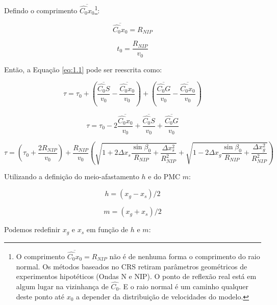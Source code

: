 \documentclass[a4paper, 12pt]{article}
\begin{document}
Defindo o comprimento $\overline{\hat{C_0}x_0}$\footnote{O comprimento
$\overline{\hat{C_0}x_0} = R_{NIP}$ não é de nenhuma forma o comprimento do raio normal.
Os métodos baseados no CRS
retiram parâmetros geométricos de experimentos hipotéticos (Ondas N e NIP).
O ponto de reflexão real está em algum lugar na vizinhança de $\hat{C_0}$.
E o raio normal é um caminho qualquer deste ponto até $x_0$ a depender da distribuição de velocidades
do modelo.}:

\begin{equation}
 \label{eq:1.20}
 \overline{\hat{C_0}x_0} = R_{NIP}
\end{equation}

\begin{equation}
 \label{eq:1.21}
t_0 = \frac{R_{NIP}}{v_0}
\end{equation}

Então, a Equação \ref{eq:1.1} pode ser reescrita como:

\begin{equation}
 \label{eq:1.22}
\tau = \tau_0 + \left( \frac{\overline{\hat{C_0}S}}{v_0} - \frac{\overline{\hat{C_0}x_0}}{v_0} \right)
+ \left( \frac{\overline{\hat{C_0}G}}{v_0} - \frac{\overline{\hat{C_0}x_0}}{v_0} \right)
\end{equation}

\begin{equation}
 \label{eq:1.23}
\tau = \tau_0 - 2 \frac{\overline{\hat{C_0}x_0}}{v_0} + \frac{\overline{\hat{C_0}S}}{v_0}
+ \frac{\overline{\hat{C_0}G}}{v_0}
\end{equation}

\begin{equation}
 \label{eq:1.24}
\tau = \left( \tau_0 + \frac{2 R_{NIP}}{v_0} \right)
+ \frac{R_{NIP}}{v_0} \left( \sqrt{  1 + 2 \Delta x_s \frac{\sin{\beta_0}}{R_{NIP}} + \frac{\Delta x_{s}^2}{R_{NIP}^2} }
+ \sqrt{  1 - 2 \Delta x_g \frac{\sin{\beta_0}}{R_{NIP}} + \frac{\Delta x_{g}^2}{R_{NIP}^2} } \right)
\end{equation}

Utilizando a definição do meio-afastamento $h$ e do PMC $m$: 

\begin{equation}
 \label{eq:1.25}
 h=(x_g-x_s)/2
\end{equation}

\begin{equation}
 \label{eq:1.26}
 m=(x_g + x_s)/2
\end{equation}

Podemos redefinir $x_g$ e $x_s$ em função de $h$ e $m$:
\end{document}

